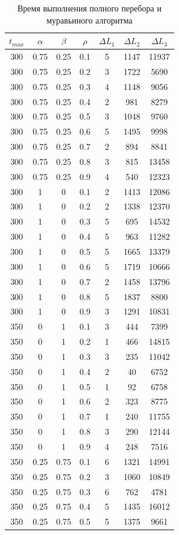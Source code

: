 \documentclass[12pt]{report}
\begin{document}
	\begin{table}[H]
		\begin{center}
			\caption[]{\label{tbl:only9} Время выполнения полного перебора и муравьиного алгоритма}
			\begin{tabular}{|c|c|c|c|c|c|c|}
				\hline
				$t_{max}$ & $\alpha$ & $\beta$ &$\rho$ & $\Delta L_{1}$ & $\Delta L_{2}$ & $\Delta L_{3}$\\
				\hline
				300 & 0.75 & 0.25 & 0.1 & 5 & 1147 & 11937 \\
				300 & 0.75 & 0.25 & 0.2 & 3 & 1722 & 5690 \\
				300 & 0.75 & 0.25 & 0.3 & 4 & 1148 & 9056 \\
				300 & 0.75 & 0.25 & 0.4 & 2 & 981 & 8279 \\
				300 & 0.75 & 0.25 & 0.5 & 3 & 1048 & 9760 \\
				300 & 0.75 & 0.25 & 0.6 & 5 & 1495 & 9998 \\
				300 & 0.75 & 0.25 & 0.7 & 2 & 894 & 8841 \\
				300 & 0.75 & 0.25 & 0.8 & 3 & 815 & 13458 \\
				300 & 0.75 & 0.25 & 0.9 & 4 & 540 & 12323 \\
				300 & 1 & 0 & 0.1 & 2 & 1413 & 12086 \\
				300 & 1 & 0 & 0.2 & 2 & 1338 & 12370 \\
				300 & 1 & 0 & 0.3 & 5 & 695 & 14532 \\
				300 & 1 & 0 & 0.4 & 5 & 963 & 11282 \\
				300 & 1 & 0 & 0.5 & 5 & 1665 & 13379 \\
				300 & 1 & 0 & 0.6 & 5 & 1719 & 10666 \\
				300 & 1 & 0 & 0.7 & 2 & 1458 & 13796 \\
				300 & 1 & 0 & 0.8 & 5 & 1837 & 8800 \\
				300 & 1 & 0 & 0.9 & 3 & 1291 & 10831 \\
				350 & 0 & 1 & 0.1 & 3 & 444 & 7399 \\
				350 & 0 & 1 & 0.2 & 1 & 466 & 14815 \\
				350 & 0 & 1 & 0.3 & 3 & 235 & 11042 \\
				350 & 0 & 1 & 0.4 & 2 & 40 & 6752 \\
				350 & 0 & 1 & 0.5 & 1 & 92 & 6758 \\
				350 & 0 & 1 & 0.6 & 2 & 323 & 8775 \\
				350 & 0 & 1 & 0.7 & 1 & 240 & 11755 \\
				350 & 0 & 1 & 0.8 & 3 & 290 & 12144 \\
				350 & 0 & 1 & 0.9 & 4 & 248 & 7516 \\
				350 & 0.25 & 0.75 & 0.1 & 6 & 1321 & 14991 \\
				350 & 0.25 & 0.75 & 0.2 & 3 & 1060 & 10849 \\
				350 & 0.25 & 0.75 & 0.3 & 6 & 762 & 4781 \\
				350 & 0.25 & 0.75 & 0.4 & 5 & 1435 & 16012 \\
				350 & 0.25 & 0.75 & 0.5 & 5 & 1375 & 9661 \\
				

\end{tabular}
\end{center}
\end{table}
\end{document}
